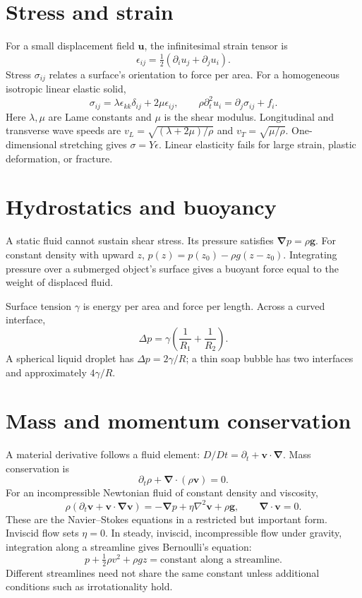 \documentclass[11pt,oneside]{book}
\newcommand{\vect}[1]{\boldsymbol{#1}}
\newcommand{\grad}{\boldsymbol{\nabla}}
\newcommand{\lap}{\nabla^2}
\theoremstyle{reviewstyle}
\begin{document}
\section{Stress and strain}
For a small displacement field $\vect u$, the infinitesimal strain tensor is
\begin{equation}
\epsilon_{ij}=\tfrac12(\partial_i u_j+\partial_j u_i).
\end{equation}
Stress $\sigma_{ij}$ relates a surface's orientation to force per area. For a homogeneous isotropic linear elastic solid,
\begin{equation}
\sigma_{ij}=\lambda\epsilon_{kk}\delta_{ij}+2\mu\epsilon_{ij},\qquad
\rho\partial_t^2u_i=\partial_j\sigma_{ij}+f_i.
\end{equation}
Here $\lambda,\mu$ are Lame constants and $\mu$ is the shear modulus. Longitudinal and transverse wave speeds are
$v_L=\sqrt{(\lambda+2\mu)/\rho}$ and $v_T=\sqrt{\mu/\rho}$. One-dimensional stretching gives $\sigma=Y\epsilon$. Linear elasticity fails for large strain, plastic deformation, or fracture.
\section{Hydrostatics and buoyancy}
A static fluid cannot sustain shear stress. Its pressure satisfies
$\grad p=\rho\vect g$. For constant density with upward $z$, $p(z)=p(z_0)-\rho g(z-z_0)$. Integrating pressure over a submerged object's surface gives a buoyant force equal to the weight of displaced fluid.

Surface tension $\gamma$ is energy per area and force per length. Across a curved interface,
\begin{equation}
\Delta p=\gamma\left(\frac{1}{R_1}+\frac{1}{R_2}\right).
\end{equation}
A spherical liquid droplet has $\Delta p=2\gamma/R$; a thin soap bubble has two interfaces and approximately $4\gamma/R$.
\section{Mass and momentum conservation}
A material derivative follows a fluid element:
$D/Dt=\partial_t+\vect v\cdot\grad$. Mass conservation is
\begin{equation}\partial_t\rho+\grad\cdot(\rho\vect v)=0.\end{equation}
For an incompressible Newtonian fluid of constant density and viscosity,
\begin{equation}
\rho\left(\partial_t\vect v+\vect v\cdot\grad\vect v\right)
=-\grad p+\eta\lap\vect v+\rho\vect g,
\qquad \grad\cdot\vect v=0.
\end{equation}
These are the Navier--Stokes equations in a restricted but important form. Inviscid flow sets $\eta=0$. In steady, inviscid, incompressible flow under gravity, integration along a streamline gives Bernoulli's equation:
\begin{equation}p+\tfrac12\rho v^2+\rho gz=\text{constant along a streamline}.\end{equation}
Different streamlines need not share the same constant unless additional conditions such as irrotationality hold.
\end{document}
